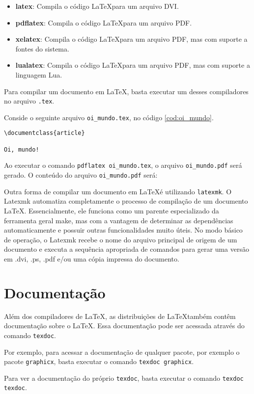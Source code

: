 \begin{itemize}
	\item \textbf{latex}: Compila o código \LaTeX para um arquivo DVI.
	\item \textbf{pdflatex}: Compila o código \LaTeX para um arquivo PDF.
	\item \textbf{xelatex}: Compila o código \LaTeX para um arquivo PDF, mas com suporte a fontes do sistema.
	\item \textbf{lualatex}: Compila o código \LaTeX para um arquivo PDF, mas com suporte a linguagem Lua.
\end{itemize}

Para compilar um documento em \LaTeX, basta executar um desses compiladores no arquivo \texttt{.tex}.

Conside o seguinte arquivo \texttt{oi\_mundo.tex}, no código \ref{cod:oi_mundo}.

\begin{lstlisting}[language={[latex]TeX}, caption={oi\_mundo.tex}, label=cod:oi_mundo]
\documentclass{article}

Oi, mundo!

\end{lstlisting}


Ao executar o comando \texttt{pdflatex oi\_mundo.tex}, o arquivo \texttt{oi\_mundo.pdf} será gerado. O conteúdo do arquivo \texttt{oi\_mundo.pdf} será:






Outra forma de compilar um documento em \LaTeX é utilizando \texttt{latexmk}. O Latexmk automatiza completamente o processo de compilação de um documento LaTeX. Essencialmente, ele funciona como um parente especializado da ferramenta geral make, mas com a vantagem de determinar as dependências automaticamente e possuir outras funcionalidades muito úteis. No modo básico de operação, o Latexmk recebe o nome do arquivo principal de origem de um documento e executa a sequência apropriada de comandos para gerar uma versão em .dvi, .ps, .pdf e/ou uma cópia impressa do documento.


\section{Documentação}

Além dos compiladores de \LaTeX, as distribuições de \LaTeX também contêm documentação sobre o \LaTeX. Essa documentação pode ser acessada através do comando \texttt{texdoc}.

Por exemplo, para acessar a documentação de qualquer pacote, por exemplo o pacote \texttt{graphicx}, basta executar o comando \texttt{texdoc graphicx}.

Para ver a documentação do próprio \texttt{texdoc}, basta executar o comando \texttt{texdoc texdoc}.
